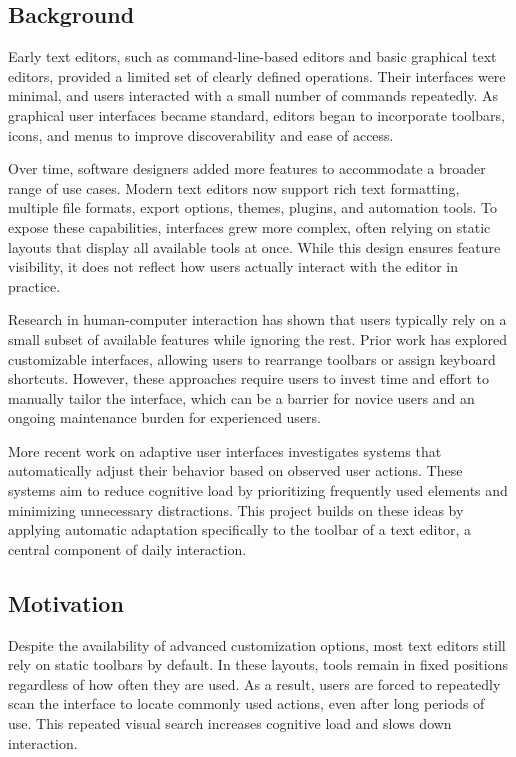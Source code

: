 \documentclass[sigconf]{acmart}
\begin{document}
\subsection{Background}

Early text editors, such as command-line-based editors and basic graphical text editors, provided a limited set of clearly defined operations. Their interfaces were minimal, and users interacted with a small number of commands repeatedly. As graphical user interfaces became standard, editors began to incorporate toolbars, icons, and menus to improve discoverability and ease of access.

Over time, software designers added more features to accommodate a broader range of use cases. Modern text editors now support rich text formatting, multiple file formats, export options, themes, plugins, and automation tools. To expose these capabilities, interfaces grew more complex, often relying on static layouts that display all available tools at once. While this design ensures feature visibility, it does not reflect how users actually interact with the editor in practice.

Research in human-computer interaction has shown that users typically rely on a small subset of available features while ignoring the rest. Prior work has explored customizable interfaces, allowing users to rearrange toolbars or assign keyboard shortcuts. However, these approaches require users to invest time and effort to manually tailor the interface, which can be a barrier for novice users and an ongoing maintenance burden for experienced users.

More recent work on adaptive user interfaces investigates systems that automatically adjust their behavior based on observed user actions. These systems aim to reduce cognitive load by prioritizing frequently used elements and minimizing unnecessary distractions. This project builds on these ideas by applying automatic adaptation specifically to the toolbar of a text editor, a central component of daily interaction.

\subsection{Motivation}

Despite the availability of advanced customization options, most text editors still rely on static toolbars by default. In these layouts, tools remain in fixed positions regardless of how often they are used. As a result, users are forced to repeatedly scan the interface to locate commonly used actions, even after long periods of use. This repeated visual search increases cognitive load and slows down interaction.
\end{document}
